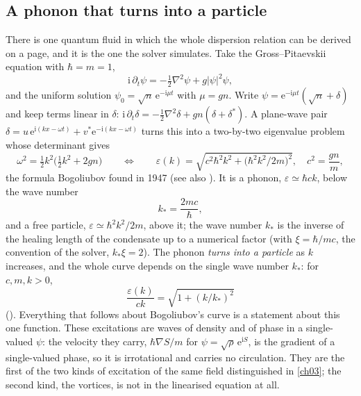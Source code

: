 \subsection{A phonon that turns into a particle}
There is one quantum fluid in which the whole dispersion relation can be derived on a page, and it is the one the solver simulates.
Take the Gross--Pitaevskii equation with $\hbar=m=1$,
\begin{equation}\label{ch05:eq-gpe}
 \mathrm i\,\partial_t\psi=-\tfrac12\nabla^2\psi+g|\psi|^2\psi ,
\end{equation}
and the uniform solution $\psi_0=\sqrt{n}\,\mathrm e^{-\mathrm i\mu t}$ with $\mu=gn$.
Write $\psi=\mathrm e^{-\mathrm i\mu t}(\sqrt n+\delta)$ and keep terms linear in $\delta$: $\mathrm i\,\partial_t\delta=-\tfrac12\nabla^2\delta+gn(\delta+\delta^*)$.
A plane-wave pair $\delta=u\,\mathrm e^{\mathrm i(kx-\omega t)}+v^*\mathrm e^{-\mathrm i(kx-\omega t)}$ turns this into a two-by-two eigenvalue problem whose determinant gives
\begin{equation}\label{ch05:eq-bog}
 \omega^2=\tfrac12k^2\bigl(\tfrac12k^2+2gn\bigr)\qquad\Longleftrightarrow\qquad
 \varepsilon(k)=\sqrt{c^2\hbar^2k^2+\bigl(\hbar^2k^2/2m\bigr)^2},\quad c^2=\frac{gn}{m},
\end{equation}
the formula Bogoliubov found in 1947 \cite{Bogoliubov1947} (see also \cite{Dalfovo1999,PitaevskiiStringari2016}).
It is a phonon, $\varepsilon\simeq\hbar ck$, below the wave number
\begin{equation}
 k_\ast=\frac{2mc}{\hbar},
\end{equation}
and a free particle, $\varepsilon\simeq\hbar^2k^2/2m$, above it; the wave number $k_\ast$ is the inverse of the healing length of the condensate up to a numerical factor (with $\xi=\hbar/mc$, the convention of the solver, $k_\ast\xi=2$).
The phonon \emph{turns into a particle} as $k$ increases, and the whole curve depends on the single wave number $k_\ast$: for $c,m,k>0$,
\begin{equation}\label{ch05:eq-universal}
 \frac{\varepsilon(k)}{ck}=\sqrt{1+(k/k_\ast)^2}
\end{equation}
().
Everything that follows about Bogoliubov's curve is a statement about this one function.
These excitations are waves of density and of phase in a single-valued $\psi$: the velocity they carry, $\hbar\nabla S/m$ for $\psi=\sqrt\rho\,\mathrm e^{\mathrm iS}$, is the gradient of a single-valued phase, so it is irrotational and carries no circulation.
They are the first of the two kinds of excitation of the same field distinguished in \cref{ch03}; the second kind, the vortices, is not in the linearised equation at all.

